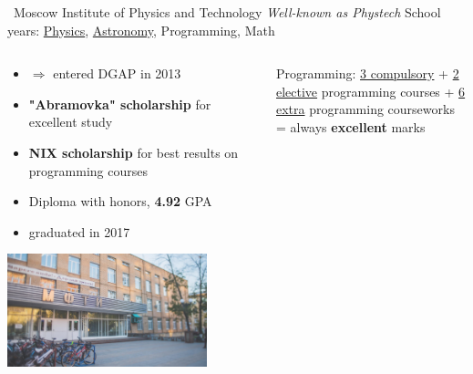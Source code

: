 \documentclass{beamer}
\begin{document}
\begin{frame}{\quad \quad ~Moscow Institute of Physics and Technology}
\textit{Well-known as Phystech}  \newline
School years: \underline{Physics}, \underline{Astronomy}, Programming, Math
\begin{columns}

\begin{column}{.59 \textwidth}
\begin{itemize}
  \item $\Rightarrow$ entered DGAP in 2013 
  \item \textbf{"Abramovka" scholarship} for excellent study
  \item \textbf{NIX scholarship} for best results on programming courses
  \item Diploma with honors, \textbf{4.92} GPA
  \item graduated in 2017
\end{itemize}
\centering
\vspace{0.1cm}
\includegraphics[width=0.8\textwidth]{Pictures/MIPT}
\end{column}
\begin{column}{.39 \textwidth}
Programming: \newline{} \newline{}
\quad \underline{3 compulsory} + \newline{}
\quad \underline{2 elective} programming courses + \newline{}
\quad \underline{6 extra} programming courseworks = \newline{}
\quad always \textbf{excellent} marks \newline{}

\end{column}
\end{columns}
\end{frame}
\end{document}
